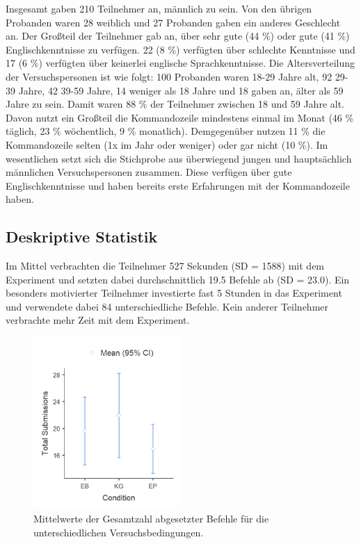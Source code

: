 Insgesamt gaben 210 Teilnehmer an, männlich zu sein. Von den übrigen Probanden waren 28 weiblich und 27 Probanden gaben ein anderes Geschlecht an. Der Großteil der Teilnehmer gab an, über sehr gute (44 \%) oder gute (41 \%) Englischkenntnisse zu verfügen. 22 (8 \%) verfügten über schlechte Kenntnisse und 17 (6 \%) verfügten über keinerlei englische Sprachkenntnisse. Die Altersverteilung der Versuchspersonen ist wie folgt: 100 Probanden waren 18-29 Jahre alt, 92  29-39 Jahre,  42 39-59 Jahre, 14 weniger als 18 Jahre und 18 gaben an, älter als 59 Jahre zu sein. Damit waren 88 \% der Teilnehmer zwischen 18 und 59 Jahre alt. Davon nutzt ein Großteil die Kommandozeile mindestens einmal im Monat (46 \% täglich, 23 \% wöchentlich, 9 \% monatlich). Demgegenüber nutzen 11 \% die Kommandozeile selten (1x im Jahr oder weniger) oder gar nicht (10 \%). Im wesentlichen setzt sich die Stichprobe aus überwiegend jungen und hauptsächlich männlichen Versuchspersonen zusammen. Diese verfügen über gute Englischkenntnisse und haben bereits erste Erfahrungen mit der Kommandozeile haben.

\subsection{Deskriptive Statistik}
Im Mittel verbrachten die Teilnehmer 527 Sekunden (SD = 1588) mit dem Experiment und setzten dabei durchschnittlich 19.5 Befehle ab (SD = 23.0). Ein besonders motivierter Teilnehmer investierte fast 5 Stunden in das Experiment und verwendete dabei 84 unterschiedliche Befehle. Kein anderer Teilnehmer verbrachte mehr Zeit mit dem Experiment.

\begin{figure}[htbp]
    \centering
    \includegraphics[width=0.5\textwidth]{img/auswertung/mean_subs.png}
    \caption{Mittelwerte der Gesamtzahl abgesetzter Befehle für die unterschiedlichen Versuchsbedingungen.}
    \label{mean_subs}
\end{figure}

